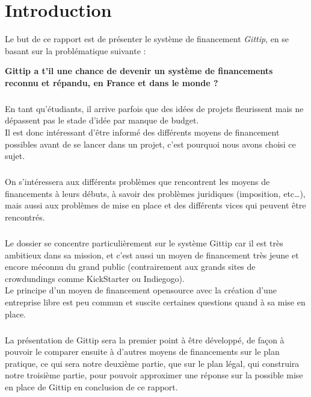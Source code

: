 \chapter{Introduction}

Le but de ce rapport est de présenter le système de financement \emph{Gittip},
en se basant sur la problématique suivante :

\begin{center}
\textbf{Gittip a t'il une chance de devenir un système de
financements reconnu et répandu, en France et dans le monde ?}
\end{center}

\paragraph{}
En tant qu'étudiants, il arrive parfois que des idées de projets fleurissent
mais ne dépassent pas le stade d'idée par manque de budget.\\
Il est donc intéressant d'être informé des différents moyens de financement
possibles avant de se lancer dans un projet, c'est pourquoi nous avons
choisi ce sujet.

\paragraph{}
On s'intéressera aux différents problèmes que rencontrent les moyens
de financements à leurs débuts, à savoir des problèmes juridiques
(imposition, etc\ldots), mais aussi aux problèmes de mise en place et des
différents vices qui peuvent être rencontrés.

\paragraph{}
Le dossier se concentre particulièrement sur le système Gittip car il
est très ambitieux dans sa mission, et c'est aussi un moyen de financement
très jeune et encore méconnu du grand public (contrairement aux grands sites
de crowdundings comme KickStarter ou Indiegogo).\\
Le principe d'un moyen de financement opensource avec la création d'une
entreprise libre est peu commun et suscite certaines questions quand à sa
mise en place.

\paragraph{}
La présentation de Gittip sera la premier point à être développé, de
façon à pouvoir le comparer ensuite à d'autres moyens de financements
sur le plan pratique, ce qui sera notre deuxième partie,
que sur le plan légal, qui construira notre troisième partie, pour pouvoir
approximer une réponse sur la possible mise en place de Gittip en conclusion
de ce rapport.
